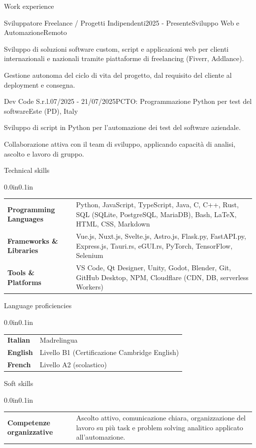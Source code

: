 \documentclass{resume} %
\makeatletter
\newcommand{\entry}[2]{#1 & #2 \tabularnewline} %
\newcommand{\tableEnv}[2]{%
  \begin{rSection}{#1} %
    \begin{adjustwidth}{0.0in}{0.1in} %
      \begin{tabularx}{\linewidth}{@{} >{\bfseries}l @{\hspace{6ex}} X @{}}
        #2 %
      \end{tabularx}
    \end{adjustwidth}
  \end{rSection}
}
\makeatother
\begin{document}
\begin{rSection}{Work experience}

    \begin{rSubsection}{Sviluppatore Freelance / Progetti Indipendenti}{2025 - Presente}{Sviluppo Web e Automazione}{Remoto}
        \item Sviluppo di soluzioni software custom, script e applicazioni web per clienti internazionali e nazionali tramite piattaforme di freelancing (Fiverr, Addlance).
        \item Gestione autonoma del ciclo di vita del progetto, dal requisito del cliente al deployment e consegna.
    \end{rSubsection}

    \begin{rSubsection}{Dev Code S.r.l.}{07/2025 - 21/07/2025}{PCTO: Programmazione Python per test del software}{Este (PD), Italy}
        \item Sviluppo di script in Python per l'automazione dei test del software aziendale.
        \item Collaborazione attiva con il team di sviluppo, applicando capacità di analisi, ascolto e lavoro di gruppo.
    \end{rSubsection}

\end{rSection}


\tableEnv{Technical skills}{
    \entry{Programming Languages}{Python, JavaScript, TypeScript, Java, C, C++, Rust, SQL (SQLite, PostgreSQL, MariaDB), Bash, \LaTeX, HTML, CSS, Markdown}
    \entry{Frameworks \& Libraries}{Vue.js, Nuxt.js, Svelte.js, Astro.js, Flask.py, FastAPI.py, Express.js, Tauri.rs, eGUI.rs, PyTorch, TensorFlow, Selenium}
    \entry{Tools \& Platforms}{VS Code, Qt Designer, Unity, Godot, Blender, Git, GitHub Desktop, NPM, Cloudflare (CDN, DB, serverless Workers)}
}


\tableEnv{Language proficiencies}{
    \entry{Italian}{Madrelingua}
    \entry{English}{Livello B1 (Certificazione Cambridge English)}
    \entry{French}{Livello A2 (scolastico)}
}


\tableEnv{Soft skills}{
    \entry{Competenze organizzative}{Ascolto attivo, comunicazione chiara, organizzazione del lavoro su più task e problem solving analitico applicato all'automazione.}
}
\end{document}
